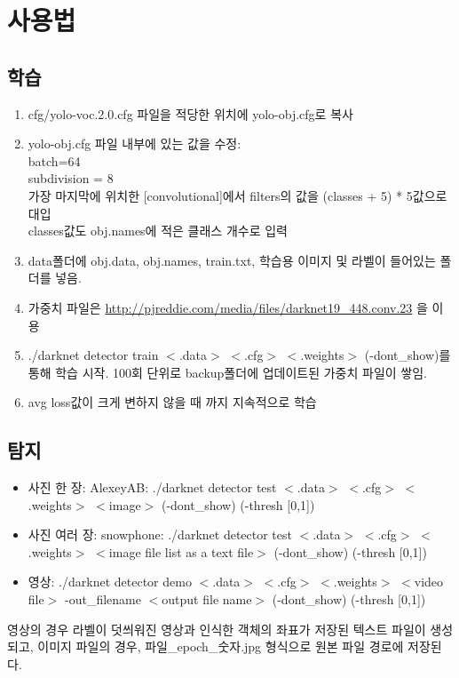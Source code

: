 \documentclass[a4paper,12pt]{article}
\begin{document}
\section{사용법}
\subsection{학습}
\begin{enumerate}
	\item cfg/yolo-voc.2.0.cfg 파일을 적당한 위치에 yolo-obj.cfg로 복사
	\item yolo-obj.cfg 파일 내부에 있는 값을 수정: 
		\\batch=64
		\\subdivision = 8
		\\가장 마지막에 위치한 [convolutional]에서 filters의 값을 (classes + 5) * 5값으로 대입
		\\classes값도 obj.names에 적은 클래스 개수로 입력
	\item data폴더에 obj.data, obj.names, train.txt, 학습용 이미지 및 라벨이 들어있는 폴더를 넣음.
	\item 가중치 파일은 \url{http://pjreddie.com/media/files/darknet19\_448.conv.23} 을 이용
	\item ./darknet detector train $<$.data$>$ $<$.cfg$>$ $<$.weights$>$ (-dont\_show)를 통해 학습 시작. 100회 단위로 backup폴더에 업데이트된 가중치 파일이 쌓임.
	\item avg loss값이 크게 변하지 않을 때 까지 지속적으로 학습
\end{enumerate}

\subsection{탐지}
\begin{itemize}
	\item 사진 한 장: AlexeyAB: ./darknet detector test $<$.data$>$ $<$.cfg$>$ $<$.weights$>$ $<$image$>$ (-dont\_show) (-thresh [0,1])
	\item 사진 여러 장: snowphone: ./darknet detector test $<$.data$>$ $<$.cfg$>$ $<$.weights$>$ $<$image file list as a text file$>$ (-dont\_show) (-thresh [0,1])
	\item 영상: ./darknet detector demo $<$.data$>$ $<$.cfg$>$ $<$.weights$>$ $<$video file$>$ -out\_filename $<$output file name$>$ (-dont\_show) (-thresh [0,1])
\end{itemize}

영상의 경우 라벨이 덧씌워진 영상과 인식한 객체의 좌표가 저장된 텍스트 파일이 생성되고, 이미지 파일의 경우, 파일\_epoch\_숫자.jpg 형식으로 원본 파일 경로에 저장된다.
\end{document}
